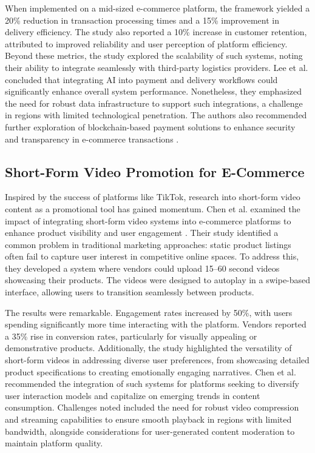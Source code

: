 \documentclass[12pt]{report}
\begin{document}
When implemented on a mid-sized e-commerce platform, the framework yielded a 20\%
reduction in transaction processing times and a 15\% improvement in delivery efficiency. The
study also reported a 10\% increase in customer retention, attributed to improved reliability
and user perception of platform efficiency. Beyond these metrics, the study explored the
scalability of such systems, noting their ability to integrate seamlessly with third-party
logistics providers. Lee et al. concluded that integrating AI into payment and delivery
workflows could significantly enhance overall system performance. Nonetheless, they
emphasized the need for robust data infrastructure to support such integrations, a challenge in
regions with limited technological penetration. The authors also recommended further
exploration of blockchain-based payment solutions to enhance security and transparency in
e-commerce transactions \cite{c18}.

\subsection*{Short-Form Video Promotion for E-Commerce}

Inspired by the success of platforms like TikTok, research into short-form video content as a
promotional tool has gained momentum. Chen et al. examined the impact of integrating
short-form video systems into e-commerce platforms to enhance product visibility and user
engagement \cite{c19}. Their study identified a common problem in traditional marketing
approaches: static product listings often fail to capture user interest in competitive online
spaces. To address this, they developed a system where vendors could upload 15–60 second
videos showcasing their products. The videos were designed to autoplay in a swipe-based
interface, allowing users to transition seamlessly between products.

The results were remarkable. Engagement rates increased by 50\%, with users spending
significantly more time interacting with the platform. Vendors reported a 35\% rise in
conversion rates, particularly for visually appealing or demonstrative products. Additionally,
the study highlighted the versatility of short-form videos in addressing diverse user
preferences, from showcasing detailed product specifications to creating emotionally
engaging narratives. Chen et al. recommended the integration of such systems for platforms
seeking to diversify user interaction models and capitalize on emerging trends in content
consumption. Challenges noted included the need for robust video compression and
streaming capabilities to ensure smooth playback in regions with limited bandwidth,
alongside considerations for user-generated content moderation to maintain platform quality\cite{c19}.
\end{document}
